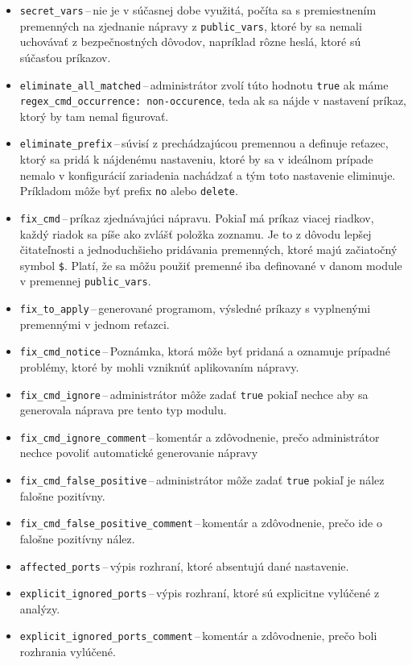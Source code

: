 \begin{itemize}
	\item \texttt{secret\_vars}\,--\,nie je v súčasnej dobe využitá, počíta sa s premiestnením premenných na zjednanie nápravy z \texttt{public\_vars}, ktoré by sa nemali uchovávať z bezpečnostných dôvodov, napríklad rôzne heslá, ktoré sú súčasťou príkazov.
	\item \texttt{eliminate\_all\_matched}\,--\,administrátor zvolí túto hodnotu \texttt{true} ak máme \texttt{regex\_cmd\_occurrence: non-occurence}, teda ak sa nájde v nastavení príkaz, ktorý by tam nemal figurovať.
	\item \texttt{eliminate\_prefix}\,--\,súvisí z prechádzajúcou premennou a definuje reťazec, ktorý sa pridá k nájdenému nastaveniu, ktoré by sa v ideálnom prípade nemalo v konfigurácií zariadenia nachádzať a tým toto nastavenie eliminuje. Príkladom môže byť prefix \texttt{no} alebo \texttt{delete}.
	\item \texttt{fix\_cmd}\,--\,príkaz zjednávajúci nápravu. Pokiaľ má príkaz viacej riadkov, každý riadok sa píše ako zvlášť položka zoznamu. Je to z dôvodu  lepšej čitateľnosti a jednoduchšieho pridávania premenných, ktoré majú začiatočný symbol \texttt{\$}. Platí, že sa môžu použiť premenné iba definované v danom module v premennej \texttt{public\_vars}.
	\item \texttt{fix\_to\_apply}\,--\,generované programom, výsledné príkazy s vyplnenými premennými v jednom reťazci.
	\item \texttt{fix\_cmd\_notice}\,--\,Poznámka, ktorá môže byť pridaná a oznamuje prípadné problémy, ktoré by mohli vzniknúť aplikovaním nápravy.
	\item \texttt{fix\_cmd\_ignore}\,--\,administrátor môže zadať \texttt{true} pokiaľ nechce aby sa generovala náprava pre tento typ modulu.
	\item \texttt{fix\_cmd\_ignore\_comment}\,--\,komentár a zdôvodnenie, prečo administrátor nechce povoliť automatické generovanie nápravy
	\item \texttt{fix\_cmd\_false\_positive}\,--\,administrátor môže zadať \texttt{true} pokiaľ je nález falošne pozitívny.
	\item \texttt{fix\_cmd\_false\_positive\_comment}\,--\,komentár a zdôvodnenie, prečo ide o falošne pozitívny nález.
	\item \texttt{affected\_ports}\,--\,výpis rozhraní, ktoré absentujú dané nastavenie.
	\item \texttt{explicit\_ignored\_ports}\,--\,výpis rozhraní, ktoré sú explicitne vylúčené z analýzy.
	\item \texttt{explicit\_ignored\_ports\_comment}\,--\,komentár a zdôvodnenie, prečo boli rozhrania vylúčené.
\end{itemize}

